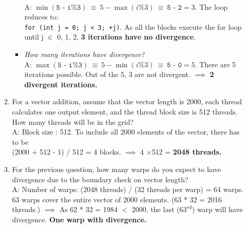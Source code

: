 \begin{enumerate}
\begin{enumerate}
\begin{itemize}
                              \\A: $\min{(\texttt{5 - i\%3})} ~\equiv~ { 5 - \max{(i\%3)}} ~\equiv~ \texttt{5 - 2} = 3$. The loop reduces to:\\\texttt{for (int j = 0; j < 3; +j)}. As all the blocks execute the for loop until j $\in$ {0, 1, 2}, \textbf{3 iterations have no divergence}.
                        \item \textsl{How many iterations have divergence?}
                              \\A: $\max{(\texttt{5 - i\%3})} ~\equiv~ { 5 - \min{(i\%3)}} ~\equiv~ \texttt{5 - 0} = 5$. There are 5 iterations possible. Out of the 5, 3 are not divergent. $\implies$ \textbf{2 divergent iterations.}
                    \end{itemize}
              \item For a vector addition, assume that the vector length is 2000, each thread calculates one output element, and the thread block size is 512 threads. How many threads will be in the grid?
                    \\A: Block size : 512. To include all 2000 elements of the vector, there has to be\\ (2000 + 512 - 1) / 512 = 4 blocks. $\implies$ 4 \(\times\)512 = \textbf{2048 threads.}
              \item For the previous question, how many warps do you expect to have divergence due to the boundary check on vector length?
                    \\A: Number of warps: (2048 threads) / (32 threads per warp) = 64 warps. 63 warps cover the entire vector of 2000 elements. (63 * 32 = 2016 threads.) $\implies$ As 62 * 32 = 1984 $<$ 2000, the last (\(63^{rd}\)) warp will have divergence. \textbf{One warp with divergence.}


\end{enumerate}
\end{enumerate}
